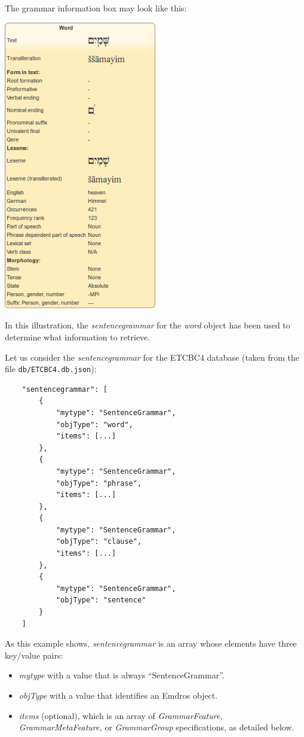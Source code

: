 \documentclass[11pt,oneside,a4paper]{memoir}
\begin{document}
The grammar information box may look like this:

\begin{center}
  \includegraphics[width=0.5\textwidth]{grammarinfo.png}
\end{center}

In this illustration, the \emph{sentencegrammar} for the \emph{word} object
has been used to determine what information to retrieve.


Let us consider the \emph{sentencegrammar} for the ETCBC4 database (taken from the file
\texttt{db/ETCBC4.db.json}):

\begin{lstlisting}
    "sentencegrammar": [
        {
            "mytype": "SentenceGrammar",
            "objType": "word",
            "items": [...]
        },
        {
            "mytype": "SentenceGrammar",
            "objType": "phrase",
            "items": [...]
        },
        {
            "mytype": "SentenceGrammar",
            "objType": "clause",
            "items": [...]
        },
        {
            "mytype": "SentenceGrammar",
            "objType": "sentence"
        }
    ]
\end{lstlisting}

As this example shows, \emph{sentencegrammar} is an array whose elements have
three key/value pairs:

\begin{itemize}
\item \emph{mytype} with a value that is always ``SentenceGrammar''.
\item \emph{objType} with a value that identifies an Emdros object.
\item \emph{items} (optional), which is an array of \emph{GrammarFeature,
  GrammarMetaFeature,} or \emph{GrammarGroup} specifications, as detailed below.
\end{itemize}
\end{document}
